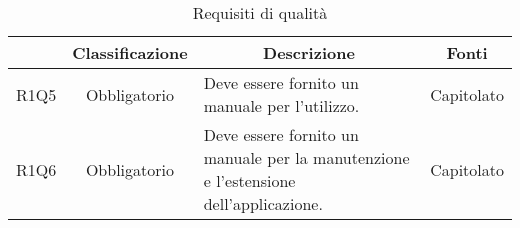 \begin{table}[H]
    \centering
    \renewcommand{\arraystretch}{1.8}
    \begin{tabular}{c | c | p{6cm} | p{4.1cm}}
        \rowcolor[HTML]{125E28}
        \multicolumn{1}{c}{\color[HTML]{FFFFFF} \textbf{Codice}}          &
        \multicolumn{1}{c}{\color[HTML]{FFFFFF} \textbf{Classificazione}} &
        \multicolumn{1}{c}{\color[HTML]{FFFFFF} \textbf{Descrizione}}     &
        \multicolumn{1}{c}{\color[HTML]{FFFFFF} \textbf{Fonti}}                                                                                                                                                    \\
        \hline
        R1Q5                                                              & Obbligatorio & Deve essere fornito un manuale per l'utilizzo.                                                             & Capitolato \\
        R1Q6                                                              & Obbligatorio & Deve essere fornito un manuale per la manutenzione e l'estensione dell'applicazione.                       & Capitolato \\
    \end{tabular}
    \caption{Requisiti di qualità}
\end{table}

